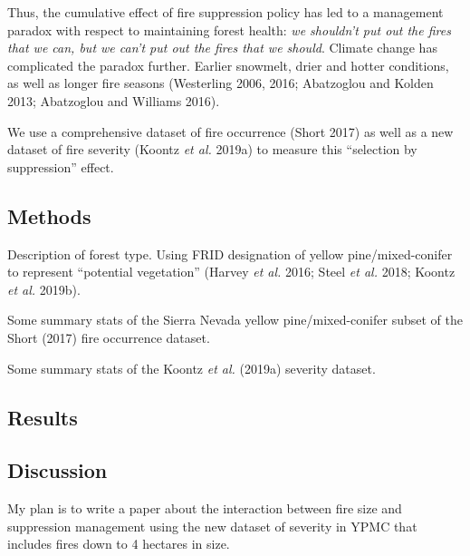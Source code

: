 \documentclass[]{article}
\begin{document}
Thus, the cumulative effect of fire suppression policy has led to a
management paradox with respect to maintaining forest health: \emph{we
shouldn't put out the fires that we can, but we can't put out the fires
that we should}. Climate change has complicated the paradox further.
Earlier snowmelt, drier and hotter conditions, as well as longer fire
seasons (Westerling 2006, 2016; Abatzoglou and Kolden 2013; Abatzoglou
and Williams 2016).

We use a comprehensive dataset of fire occurrence (Short 2017) as well
as a new dataset of fire severity (Koontz \emph{et al.} 2019a) to
measure this ``selection by suppression'' effect.

\subsection{Methods}\label{methods}

Description of forest type. Using FRID designation of yellow
pine/mixed-conifer to represent ``potential vegetation'' (Harvey
\emph{et al.} 2016; Steel \emph{et al.} 2018; Koontz \emph{et al.}
2019b).

Some summary stats of the Sierra Nevada yellow pine/mixed-conifer subset
of the Short (2017) fire occurrence dataset.

Some summary stats of the Koontz \emph{et al.} (2019a) severity dataset.

\subsection{Results}\label{results}

\subsection{Discussion}\label{discussion}

My plan is to write a paper about the interaction between fire size and
suppression management using the new dataset of severity in YPMC that
includes fires down to 4 hectares in size.
\end{document}
